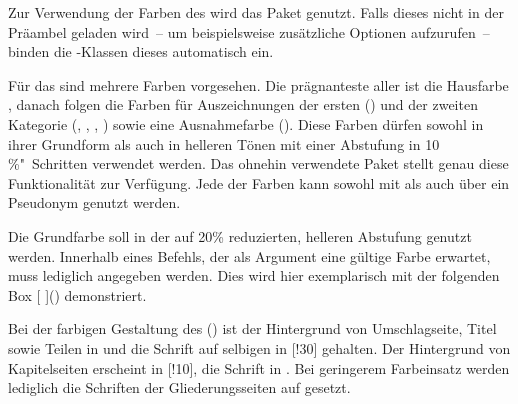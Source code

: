 \begin{Bundle*}{}
Zur Verwendung der Farben des \CDs wird das Paket  
genutzt. Falls dieses nicht in der Präambel geladen wird~-- um beispielsweise 
zusätzliche Optionen aufzurufen~-- binden die \TUDScript-Klassen dieses 
automatisch ein.

Für das \CD sind mehrere Farben vorgesehen. Die prägnanteste aller ist die 
Hausfarbe , danach folgen die Farben für Auszeichnungen der ersten
() und der zweiten Kategorie (, , 
, ) sowie eine Ausnahmefarbe (). 
Diese Farben dürfen sowohl in ihrer Grundform als auch in helleren Tönen mit 
einer Abstufung in 10\,\%"~Schritten verwendet werden. Das ohnehin verwendete 
Paket  stellt genau diese Funktionalität zur Verfügung. Jede 
der Farben kann sowohl mit  als auch über ein Pseudonym 
 genutzt werden.
%
\begin{Example*}
Die Grundfarbe  soll in der auf 20\% reduzierten, helleren 
Abstufung genutzt werden. Innerhalb eines Befehls, der als Argument eine 
gültige Farbe erwartet, muss lediglich  angegeben werden. 
Dies wird hier exemplarisch mit der folgenden \colorbox{HKS44!20}{%
  Box [%
  ]()%
}
demonstriert.
\end{Example*}
%
Bei der farbigen Gestaltung des \CDs () ist der Hintergrund 
von Umschlagseite, Titel sowie Teilen in  und die Schrift auf 
selbigen in [!30] gehalten. Der Hintergrund von Kapitelseiten 
erscheint in [!10], die Schrift in . Bei geringerem 
Farbeinsatz werden lediglich die Schriften der Gliederungsseiten auf 
 gesetzt.


\end{Bundle*}
